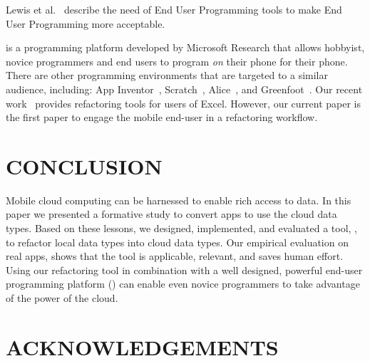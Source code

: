 \documentclass[article]{sigplanconf}
\begin{document}
Lewis et al.~\cite{lewis2009report} describe the need of End User Programming tools to make End User Programming more acceptable.  

\TD is a programming platform developed by Microsoft Research that allows hobbyist, novice programmers and end users  to program \emph{on} their phone for their phone.  There are other programming environments that are targeted to a similar audience, including:  App Inventor~\cite{Wolber}, Scratch~\cite{maloney2010scratch}, Alice~\cite{cooper2010design}, and Greenfoot~\cite{kolling2010greenfoot}. 
Our recent work~\cite{badame2012refactoring} provides refactoring tools for users of Excel. 
However, our current paper is the first paper to engage the mobile end-user in a refactoring workflow.


\section{CONCLUSION}
\label{sec:conclusions}
Mobile cloud computing can be harnessed to enable rich access to data. 
In this paper we presented a formative study to convert \numFormative apps to use the \TD cloud data types. 
Based on these lessons, we designed, implemented, and evaluated a tool,  \tool,  to refactor local data types into cloud data types.  
Our empirical evaluation on \numScripts real apps, shows that the tool is applicable, relevant, and saves human effort.
Using our refactoring tool in combination with a well designed, powerful end-user programming platform (\TD) can enable even novice programmers to take advantage of the power of the cloud.


\section{ACKNOWLEDGEMENTS}






\end{document}
